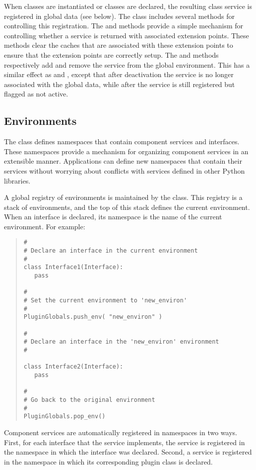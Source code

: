 When  classes are instantiated or 
classes are declared, the resulting class service is registered in global \pcasp
data (see below).  The  class includes several methods
for controlling this registration.  The  and 
methods provide a simple mechanism for controlling whether a service
is returned with associated extension points.  These methods clear the
\pcasp caches that are associated with these extension points to ensure
that the extension points are correctly setup.  The 
and  methods respectively add and remove the service
from the global environment.  This has a similar effect as 
and , except that after deactivation the service is no
longer associated with the \pcasp global data, while after 
the service is still registered but flagged as not active.


\subsection{Environments}

The  class defines namespaces that contain component services and interfaces.
These namespaces provide
a mechanism for organizing component services in an extensible
manner. Applications can define new namespaces that contain their services
without worrying about conflicts with services defined in other Python
libraries.

A global registry of environments
is maintained by the  class. This registry is a stack
of environments, and the top of this stack defines the current
environment. When an interface is declared, its namespace is the name
of the current environment. For example:
\begin{quotation}
\begin{lstlisting}
#
# Declare an interface in the current environment
#
class Interface1(Interface):
   pass

#
# Set the current environment to 'new_environ'
#
PluginGlobals.push_env( "new_environ" )

#
# Declare an interface in the 'new_environ' environment
#

class Interface2(Interface):
   pass

#
# Go back to the original environment
#
PluginGlobals.pop_env()
\end{lstlisting}
\end{quotation}
Component services are automatically registered in namespaces in two ways.  First,
for each interface that the service implements, the service is registered in 
the namespace in which the interface was declared.  Second, a service is 
registered in the namespace in which its corresponding plugin class is declared.

